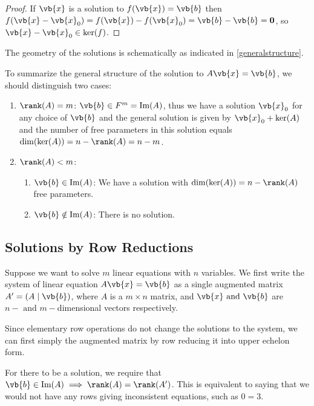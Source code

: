 \documentclass[a4paper,12pt]{report}
\begin{document}
\begin{proof}
If \(\vb{x} \) is a solution to \(f(\vb{x} ) = \vb{b} \) then \(f(\vb{x} - \vb{x} _{0} ) = f(\vb{x} ) - f(\vb{x} _{0} ) = \vb{b} -\vb{b} =\boldsymbol{0} \), so \(\vb{x} - \vb{x} _{0} \in \ker (f) \).     
\end{proof}

The geometry of the solutions is schematically as indicated in \cref{generalstructure}.


To summarize the general structure of the solution to \(A\vb{x} = \vb{b} \), we should distinguish two cases:

\begin{enumerate}
    \item \(\rank (A) = m\): \(\vb{b} \in F^{m} = \text{Im} (A)\), thus we have a solution \(\vb{x} _{0} \) for any choice of \(\vb{b} \) and the general solution is given by \(\vb{x} _{0} + \ker (A) \) and the number of free parameters in this solution equals \(\dim (\ker (A)) = n - \rank (A) = n-m\).     
    \item \(\rank (A) < m\): \begin{enumerate}
        \item \(\vb{b} \in  \text{Im}(A) \): We have a solution with \(\dim (\ker (A)) = n - \rank (A)\) free parameters.
        \item \(\vb{b} \notin \text{Im}(A) \): There is no solution.  
    \end{enumerate}  
\end{enumerate}

\subsection{Solutions by Row Reductions}

Suppose we want to solve \(m\) linear equations with \(n\) variables. We first write the system of linear equation \(A\vb{x} = \vb{b} \) as a single augmented matrix \(A' = (A \mid \vb{b} )\), where \(A\) is a \(m \times n\) matrix, and \(\vb{x} \text { and } \vb{b} \) are \(n- \text { and } m-\)dimensional vectors respectively. 

Since elementary row operations do not change the solutions to the system, we can first simply the augmented matrix by row reducing it into upper echelon form.

For there to be a solution, we require that \(\vb{b} \in  \text{Im}(A) \implies \rank (A) = \rank (A')\). This is equivalent to saying that we would not have any rows giving inconsistent equations, such as \(0=3\).
\end{document}
